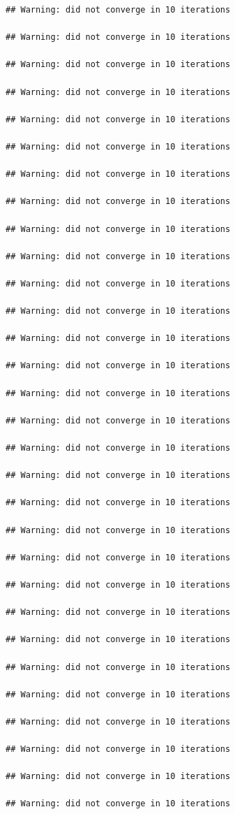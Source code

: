 \documentclass[
]{book}
\begin{document}
\begin{verbatim}
## Warning: did not converge in 10 iterations

## Warning: did not converge in 10 iterations

## Warning: did not converge in 10 iterations

## Warning: did not converge in 10 iterations

## Warning: did not converge in 10 iterations

## Warning: did not converge in 10 iterations

## Warning: did not converge in 10 iterations

## Warning: did not converge in 10 iterations

## Warning: did not converge in 10 iterations

## Warning: did not converge in 10 iterations

## Warning: did not converge in 10 iterations

## Warning: did not converge in 10 iterations

## Warning: did not converge in 10 iterations

## Warning: did not converge in 10 iterations

## Warning: did not converge in 10 iterations

## Warning: did not converge in 10 iterations

## Warning: did not converge in 10 iterations

## Warning: did not converge in 10 iterations

## Warning: did not converge in 10 iterations

## Warning: did not converge in 10 iterations

## Warning: did not converge in 10 iterations

## Warning: did not converge in 10 iterations

## Warning: did not converge in 10 iterations

## Warning: did not converge in 10 iterations

## Warning: did not converge in 10 iterations

## Warning: did not converge in 10 iterations

## Warning: did not converge in 10 iterations

## Warning: did not converge in 10 iterations

## Warning: did not converge in 10 iterations

## Warning: did not converge in 10 iterations


\end{verbatim}
\end{document}
